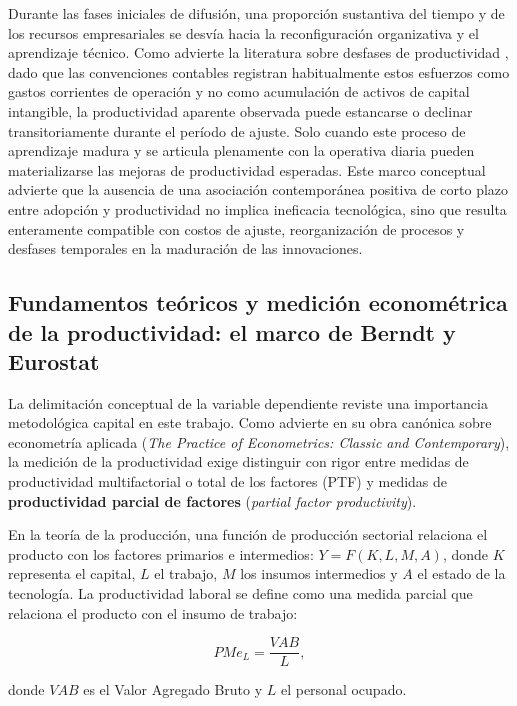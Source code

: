 \documentclass[12pt,a4paper]{article}
\begin{document}
Durante las fases iniciales de difusión, una proporción sustantiva del tiempo y de los recursos empresariales se desvía hacia la reconfiguración organizativa y el aprendizaje técnico. Como advierte la literatura sobre desfases de productividad \citep{brynjolfsson2021productivity}, dado que las convenciones contables registran habitualmente estos esfuerzos como gastos corrientes de operación y no como acumulación de activos de capital intangible, la productividad aparente observada puede estancarse o declinar transitoriamente durante el período de ajuste. Solo cuando este proceso de aprendizaje madura y se articula plenamente con la operativa diaria pueden materializarse las mejoras de productividad esperadas. Este marco conceptual advierte que la ausencia de una asociación contemporánea positiva de corto plazo entre adopción y productividad no implica ineficacia tecnológica, sino que resulta enteramente compatible con costos de ajuste, reorganización de procesos y desfases temporales en la maduración de las innovaciones.

\subsection{Fundamentos teóricos y medición econométrica de la productividad: el marco de Berndt y Eurostat}

La delimitación conceptual de la variable dependiente reviste una importancia metodológica capital en este trabajo. Como advierte \citet[Caps.~2 y 9]{berndt1991practice} en su obra canónica sobre econometría aplicada (\textit{The Practice of Econometrics: Classic and Contemporary}), la medición de la productividad exige distinguir con rigor entre medidas de productividad multifactorial o total de los factores (PTF) y medidas de \textbf{productividad parcial de factores} (\textit{partial factor productivity}).

En la teoría de la producción, una función de producción sectorial relaciona el producto con los factores primarios e intermedios: $Y = F(K, L, M, A)$, donde $K$ representa el capital, $L$ el trabajo, $M$ los insumos intermedios y $A$ el estado de la tecnología. La productividad laboral se define como una medida parcial que relaciona el producto con el insumo de trabajo:

\begin{equation}
  PMe_L = \frac{VAB}{L},
\end{equation}

donde $VAB$ es el Valor Agregado Bruto y $L$ el personal ocupado.
\end{document}
